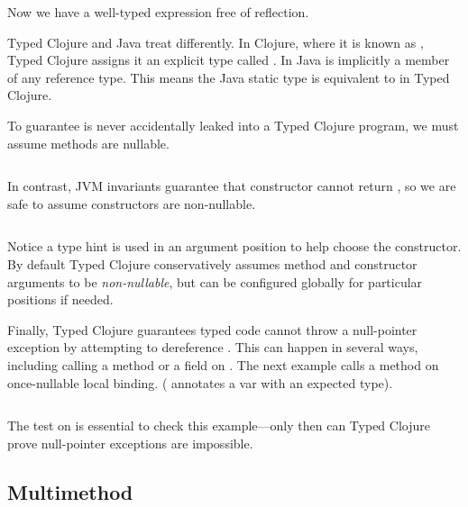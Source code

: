Now we have a well-typed expression free of reflection.

Typed Clojure and Java treat  differently.
In Clojure, where it is known as , Typed Clojure assigns it an explicit type
called . In Java  is implicitly a member of any reference type.
This means the Java static type  is equivalent to
 in Typed Clojure.

To guarantee  is never accidentally leaked into a Typed Clojure program,
we must assume methods are nullable.

\begin{exmp}
\inputminted[firstline=12,lastline=13]{clojure}{code/demo/src/demo/parent3.clj}
\end{exmp}

In contrast, JVM invariants guarantee that  constructor cannot return ,
so we are safe to assume constructors are non-nullable.

\begin{exmp}
\begin{listing}
\inputminted[firstline=15,lastline=16]{clojure}{code/demo/src/demo/parent3.clj}
\end{listing}
\end{exmp}

Notice a type hint is used in an argument position to help choose the 
constructor. By default Typed Clojure conservatively assumes method and constructor arguments to be \emph{non-nullable},
but can be configured globally for particular positions if needed.

Finally, Typed Clojure guarantees typed code cannot throw a null-pointer exception
by attempting to dereference . This can happen in several ways, including
calling a method or a field on .
The next example calls a method on once-nullable local binding.
( annotates a var with an expected type).

\begin{exmp}
\inputminted[firstline=6,lastline=8]{clojure}{code/demo/src/demo/parent3.clj}
\end{exmp}

The test on  is essential to check this example---only then can Typed Clojure
prove null-pointer exceptions are impossible.

\subsection{Multimethod}

